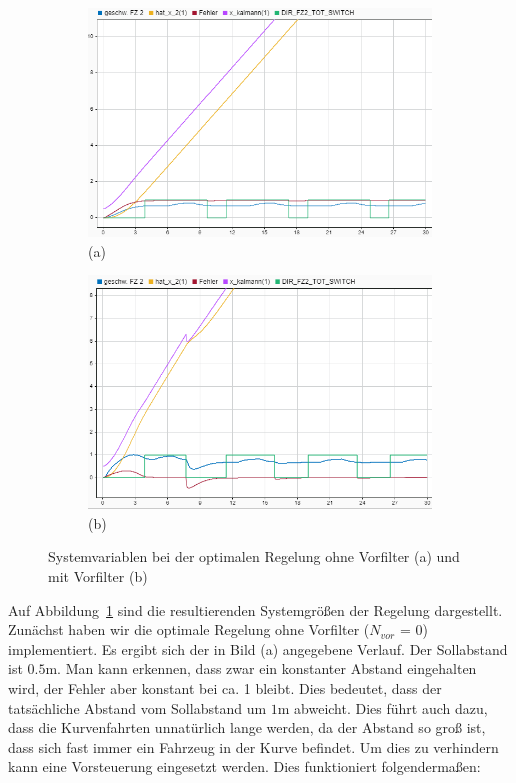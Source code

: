 \begin{figure}[hbt]
\centering
\begin{subfigure}{0.49\textwidth}
    \centering
    \includegraphics*[width=\textwidth]{figures/opt_reg_raw_03.png}\\
    (a)
\end{subfigure}
\begin{subfigure}{0.49\textwidth}
    \centering
    \includegraphics*[width=\textwidth]{figures/opt_reg_vor_03.png}\\
    (b)
\end{subfigure}
    \caption{Systemvariablen bei der optimalen Regelung ohne Vorfilter (a) und
        mit Vorfilter (b)
    \label{fig:optreggrap}}
\end{figure}    

Auf Abbildung~\ref{fig:optreggrap} sind die resultierenden Systemgrößen der
Regelung dargestellt. Zunächst haben wir die optimale Regelung ohne Vorfilter
($N_{vor}$ = 0) implementiert. Es ergibt sich der in Bild (a) angegebene
Verlauf. Der Sollabstand ist $0.5 \mathrm{m}$. Man kann erkennen, dass zwar ein
konstanter Abstand eingehalten wird, der Fehler aber konstant bei ca. 1 bleibt.
Dies bedeutet, dass der tatsächliche Abstand vom Sollabstand um $1 \mathrm{m}$
abweicht. Dies führt auch dazu, dass die Kurvenfahrten unnatürlich lange werden,
da der Abstand so groß ist, dass sich fast immer ein Fahrzeug in der Kurve
befindet. Um dies zu verhindern kann eine Vorsteuerung eingesetzt werden. Dies
funktioniert folgendermaßen:

